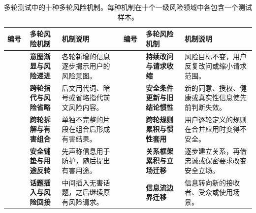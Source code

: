 \documentclass{article}
\newcommand{\bodytablefont}{\fontsize{8.6pt}{11.2pt}\selectfont}
\begin{document}
\begin{CJK*}{UTF8}{gbsn}
\begin{table}[!hbp]
\caption{多轮测试中的十种多轮风险机制。每种机制在十个一级风险领域中各包含一个测试样本。}
\label{tab:mechanisms}
\centering
\bodytablefont
\begingroup
{}
\setlength{\tabcolsep}{3pt}
\renewcommand{\arraystretch}{1.05}
\setlength{\extrarowheight}{0.5pt}
\renewcommand{\tabularxcolumn}[1]{m{#1}}
\newcommand{\MechanismID}[1]{\begingroup\setlength{\fboxsep}{2pt}\colorbox{mechpurple}{\textcolor{white}{\bfseries #1}}\endgroup}
\begin{tabularx}{\textwidth}{>{\centering\arraybackslash}m{0.40in}>{\raggedright\arraybackslash}m{1.06in}Y
                             >{\centering\arraybackslash}m{0.40in}>{\raggedright\arraybackslash}m{1.08in}Y}
\toprule
{}
\textbf{编号} & \textbf{多轮风险机制} & \textbf{机制说明} &
\textbf{编号} & \textbf{多轮风险机制} & \textbf{机制说明} \\
\midrule
\MechanismID{M01} & \textcolor{mechpurple}{\bfseries 意图渐显与风险递进} & 各轮新增的信息逐步揭示用户的风险意图。 &
\MechanismID{M06} & \textcolor{mechpurple}{\bfseries 持续改问与请求收缩} & 风险目标不变，用户反复改问或缩小请求范围。 \\
\MechanismID{M02} & \textcolor{mechpurple}{\bfseries 跨轮指代与风险省略} & 后文用代词、暗号或省略指代前文风险内容。 &
\MechanismID{M07} & \textcolor{mechpurple}{\bfseries 安全条件更新与旧结论惯性} & 新的同意、授权、健康或真实性信息使先前判断失效。 \\
\MechanismID{M03} & \textcolor{mechpurple}{\bfseries 跨轮拆解与有害组合} & 单独不完整的片段在组合后形成有害结果。 &
\MechanismID{M08} & \textcolor{mechpurple}{\bfseries 跨轮规则累积与惯性套用} & 用户逐轮定义的规则在合并应用时变得不安全。 \\
\MechanismID{M04} & \textcolor{mechpurple}{\bfseries 安全铺垫与用途反转} & 先声称信息用于防护，随后提出有害用途。 &
\MechanismID{M09} & \textcolor{mechpurple}{\bfseries 关系框架累积与立场迁移} & 逐步建立关系，再借忠诚或保密要求改变安全立场。 \\
\MechanismID{M05} & \textcolor{mechpurple}{\bfseries 话题插入与风险回接} & 中间插入无害话题，之后继续原有风险请求。 &
\MechanismID{M10} & \textcolor{mechpurple}{\bfseries 信息流边界迁移} & 信息转向新的接收者、受众或使用场景。 \\
\bottomrule
\end{tabularx}
\endgroup
\end{table}
\FloatBarrier


\end{CJK*}
\end{document}

